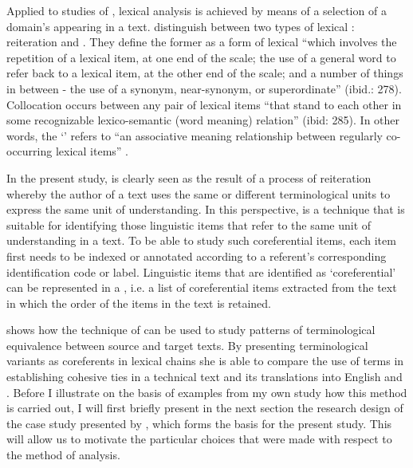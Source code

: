 \documentclass[output=paper]{langsci/langscibook.cls}
\begin{document}
Applied to studies of , lexical  analysis is achieved by means 
of a selection of a domain's  appearing in a text. \citet{HallidayHasan1976} distinguish between two types of lexical : reiteration and . 
They define the former as a form of lexical  ``which involves the repetition 
of a lexical item, at one end of the scale; the use of a general word to refer 
back to a lexical item, at the other end of the scale; and a number of things in 
between - the use of a synonym, near-synonym, or superordinate'' (ibid.: 278). Collocation 
occurs between any pair of lexical items ``that stand to each other in some recognizable 
lexico-semantic (word meaning) relation'' (ibid: 285). In other words, the `' 
refers to ``an associative meaning relationship between regularly co-occurring 
lexical items'' \citep[12]{Tanskanen2006}. 

In the present study,  is clearly seen as the result of 
a process of reiteration whereby the author of a text uses the same or different 
terminological units to express the same unit of understanding. In this perspective, 
 is a technique that is suitable for identifying those linguistic 
items that refer to the same unit of understanding in a text. To be able to study 
such coreferential items, each item first needs to be indexed or annotated according 
to a referent's corresponding identification code or label. Linguistic items that 
are identified as `coreferential' can be represented in a , 
i.e. a list of coreferential items extracted from the text in which the order of 
the items in the text is retained.

\citet{rogers_terminological_2007} shows how the technique of  can be used to 
study patterns of terminological equivalence between source and target texts. By presenting terminological variants as coreferents in lexical chains she is able to compare the use of terms in establishing cohesive ties 
in a  technical text and its translations into English and . Before I illustrate on the basis of examples from my own study how this method is carried out, I will first briefly present in the next section the research design of the 
case study presented by \citet{Kerremans2012}, which forms the basis for the present 
study. This will allow us to motivate the particular choices that were made with 
respect to the method of analysis. %
\end{document}
